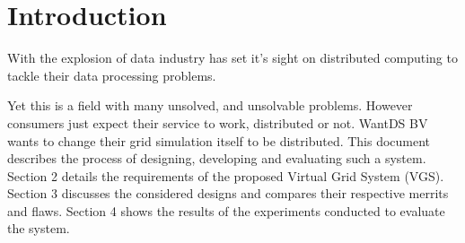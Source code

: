 \section{Introduction}
With the explosion of data industry has set it's sight on distributed
computing to tackle their data processing problems.

Yet this is a field with many unsolved, and unsolvable problems.
However consumers just expect their service to work, distributed or
not.
WantDS BV wants to change their grid simulation itself to be
distributed. 
This document describes the process of designing, developing and
evaluating such a system.
Section 2 details the requirements of the proposed Virtual Grid
System (VGS).
Section 3 discusses the considered designs and compares their
respective merrits and flaws.
Section 4 shows the results of the experiments conducted to evaluate
the system.
